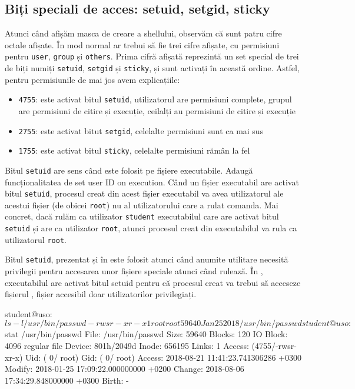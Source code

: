 \subsection{Biți speciali de acces: setuid, setgid, sticky}
\label{sec:user:special-bits}

Atunci când afișăm masca de creare a shellului, observăm că sunt patru cifre octale
afișate. În mod normal ar trebui să fie trei cifre afișate, cu permisiuni pentru
\texttt{user}, \texttt{group} și \texttt{others}. Prima cifră afișată reprezintă un set special de trei de
biți numiți \texttt{setuid}, \texttt{setgid} și \texttt{sticky}, și sunt activați în această ordine.
Astfel, pentru permisiunile de mai jos avem explicațiile:

\begin{itemize}
  \item \texttt{4755}: este activat bitul \texttt{setuid}, utilizatorul are permisiuni
    complete, grupul are permisiuni de citire și execuție, ceilalți
    au permisiuni de citire și execuție
  \item \texttt{2755}: este activat bitut \texttt{setgid}, celelalte permisiuni sunt ca mai
    sus
  \item \texttt{1755}: este activat bitul \texttt{sticky}, celelalte permisiuni rămân la fel
\end{itemize}

Bitul \texttt{setuid} are sens când este folosit pe fișiere executabile. Adaugă
funcționalitatea de set user ID on execution. Când un fișier executabil are
activat bitul \texttt{setuid}, procesul creat din acest fișier executabil va avea
utilizatorul ale acestui fișier (de obicei \texttt{root}) nu al utilizatorului care a
rulat comanda. Mai concret, dacă rulăm ca utilizator \texttt{student} executabilul 
care are activat bitul \texttt{setuid} și are ca utilizator \texttt{root}, atunci procesul creat
din executabilul  va rula ca utilizatorul \texttt{root}.

Bitul \texttt{setuid}, prezentat și în  este folosit atunci când anumite utilitare necesită privilegii
pentru accesarea unor fișiere speciale atunci când rulează. În ,
executabilul  are activat bitul setuid pentru că procesul creat
va trebui să acceseze fișierul , fișier accesibil doar utilizatorilor
privilegiați.

\begin{screen}[caption={Folosirea bitului setuid},label={lst:user:use-setuid}]
student@uso:~$ ls -l /usr/bin/passwd
-rwsr-xr-x 1 root root 59640 Jan 25  2018 /usr/bin/passwd
student@uso:~$ stat /usr/bin/passwd
  File: /usr/bin/passwd
  Size: 59640             Blocks: 120        IO Block: 4096   regular file
Device: 801h/2049d        Inode: 656195      Links: 1
Access: (4755/-rwsr-xr-x)  Uid: (    0/    root)   Gid: (    0/    root)
Access: 2018-08-21 11:41:23.741306286 +0300
Modify: 2018-01-25 17:09:22.000000000 +0200
Change: 2018-08-06 17:34:29.848000000 +0300
 Birth: -
\end{screen}

